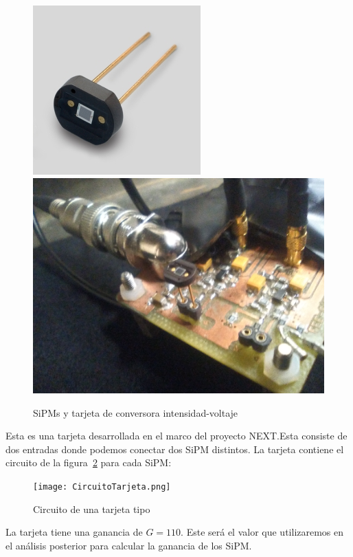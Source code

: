 \begin{enumerate}
\begin{figure}[htb]
\centering
{
\includegraphics[scale=0.50]{SiPM.png} 
}
{
\includegraphics[scale=0.20]{tarjeta.png} 
}
\caption{SiPMs y tarjeta de conversora intensidad-voltaje\label{TarjetaSiPM}}
\end{figure}
Esta es una tarjeta desarrollada en el marco del proyecto NEXT.Esta consiste de dos entradas donde podemos conectar dos SiPM distintos. La tarjeta contiene el circuito  de la figura~\ref{esquemacircuitotarjeta} para cada SiPM:

\begin{figure}[hbtp]
\centering
\texttt{[image: CircuitoTarjeta.png]}
\caption{Circuito de una tarjeta tipo~\cite{datasheet SiPM}\label{esquemacircuitotarjeta}}
\end{figure}

La tarjeta tiene una ganancia de $G=110$. Este será el valor que utilizaremos en el análisis posterior para calcular la ganancia de los SiPM.


\end{enumerate}
